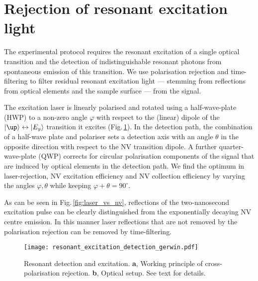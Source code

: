 \section{Rejection of resonant excitation light}
The experimental protocol requires the resonant excitation of a single optical transition and the detection of indistinguishable resonant photons from spontaneous emission of this transition. We use polarisation rejection and time-filtering to filter residual resonant excitation light --- stemming from reflections from optical elements and the sample surface --- from the signal.

The excitation laser is linearly polarised and rotated using a half-wave-plate (HWP) to a non-zero angle $\varphi$  with respect to the (linear) dipole of the $\ket{\up}\leftrightarrow\ket{E_y}$ transition it excites (Fig.\,\ref{fig:resonant_detection}). In the detection path, the combination of a half-wave plate and polariser sets a detection axis with an angle $\theta$ in the opposite direction with respect to the NV transition dipole. A further quarter-wave-plate (QWP) corrects for circular polarisation components of the signal that are induced by optical elements in the detection path.  We find the optimum in laser-rejection, NV excitation efficiency and NV collection efficiency by varying the angles $\varphi,\theta$ while keeping $\varphi + \theta = 90^\circ$.

As can be seen in Fig.\,\ref{fig:laser_vs_nv}, reflections of the two-nanosecond excitation pulse can be clearly distinguished from the exponentially decaying NV centre emission. In this manner laser reflections that are not removed by the polarisation rejection can be removed by time-filtering. %
\begin{figure}[h]
\centering
\texttt{[image: resonant\_excitation\_detection\_gerwin.pdf]}
\caption{Resonant detection and excitation. \textbf{a}, Working principle of cross-polarisation rejection. \textbf{b}, Optical setup. See text for details.}
\label{fig:resonant_detection}
\end{figure}

